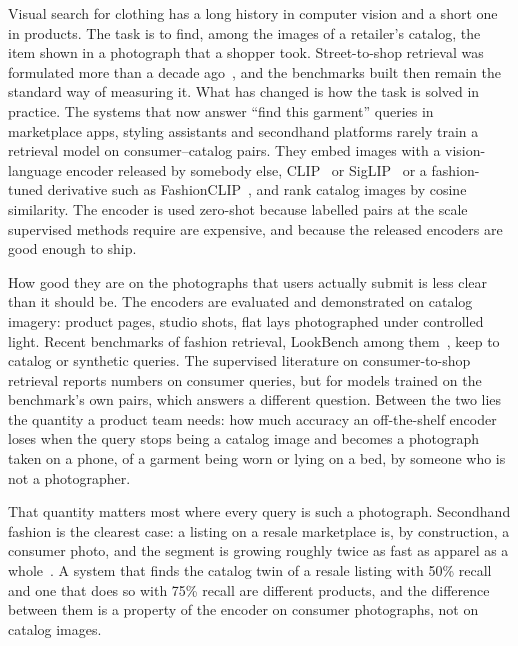 \documentclass[10pt,twocolumn,letterpaper]{article}
\begin{document}
Visual search for clothing has a long history in computer vision and a short one in products. The task is to find, among the images of a retailer's catalog, the item shown in a photograph that a shopper took. Street-to-shop retrieval was formulated more than a decade ago~\cite{liu2012street,kiapour2015where,liu2016deepfashion}, and the benchmarks built then remain the standard way of measuring it. What has changed is how the task is solved in practice. The systems that now answer ``find this garment'' queries in marketplace apps, styling assistants and secondhand platforms rarely train a retrieval model on consumer--catalog pairs. They embed images with a vision-language encoder released by somebody else, CLIP~\cite{radford2021clip} or SigLIP~\cite{zhai2023siglip} or a fashion-tuned derivative such as FashionCLIP~\cite{chia2022fashionclip}, and rank catalog images by cosine similarity. The encoder is used zero-shot because labelled pairs at the scale supervised methods require are expensive, and because the released encoders are good enough to ship.

How good they are on the photographs that users actually submit is less clear than it should be. The encoders are evaluated and demonstrated on catalog imagery: product pages, studio shots, flat lays photographed under controlled light. Recent benchmarks of fashion retrieval, LookBench among them~\cite{gao2026lookbench}, keep to catalog or synthetic queries. The supervised literature on consumer-to-shop retrieval reports numbers on consumer queries, but for models trained on the benchmark's own pairs, which answers a different question. Between the two lies the quantity a product team needs: how much accuracy an off-the-shelf encoder loses when the query stops being a catalog image and becomes a photograph taken on a phone, of a garment being worn or lying on a bed, by someone who is not a photographer.

That quantity matters most where every query is such a photograph. Secondhand fashion is the clearest case: a listing on a resale marketplace is, by construction, a consumer photo, and the segment is growing roughly twice as fast as apparel as a whole~\cite{thredup2026}. A system that finds the catalog twin of a resale listing with 50\% recall and one that does so with 75\% recall are different products, and the difference between them is a property of the encoder on consumer photographs, not on catalog images.
\end{document}
